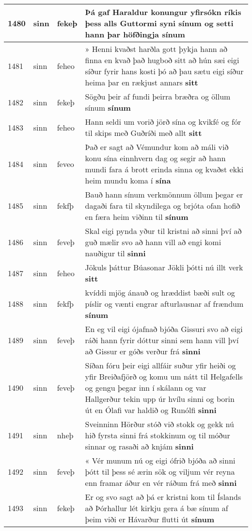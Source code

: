 \documentclass{article}
\begin{document}
\begin{longtable}{p{1cm}|p{1cm}|p{1cm}|p{13cm}}
\hline
1480&sinn&fekeþ&Þá gaf Haraldur konungur yfirsókn ríkis þess alls Guttormi syni sínum og setti hann þar höfðingja \textbf{sínum} \\
\hline
1481&sinn&feheo&» Henni kvaðst harðla gott þykja hann að finna en kvað það hugboð sitt að hún sæi eigi síður fyrir hans kosti þó að þau sætu eigi síður heima þar en rækjust annars \textbf{sitt} \\
\hline
1482&sinn&fekeþ&Sögðu þeir af fundi þeirra bræðra og öllum sínum \textbf{sínum} \\
\hline
1483&sinn&feheo&Hann seldi um vorið jörð sína og kvikfé og fór til skips með Guðríði með allt \textbf{sitt} \\
\hline
1484&sinn&feveo&Það er sagt að Vémundur kom að máli við konu sína einnhvern dag og segir að hann mundi fara á brott erinda sinna og kvaðst ekki heim mundu koma í \textbf{sína} \\
\hline
1485&sinn&fekfþ&Bauð hann sínum verkmönnum öllum þegar er dagaði fara til skyndilega og brjóta ofan hofið en færa heim viðinn til \textbf{sínum} \\
\hline
1486&sinn&feveþ&Skal eigi pynda yður til kristni að sinni því að guð mælir svo að hann vill að engi komi nauðigur til \textbf{sinni} \\
\hline
1487&sinn&feheo&Jökuls þáttur Búasonar Jökli þótti nú illt verk \textbf{sitt} \\
\hline
1488&sinn&fekfþ&kvíddi mjög ánauð og hræddist bæði sult og píslir og vænti engrar afturlausnar af frændum \textbf{sínum} \\
\hline
1489&sinn&feveþ&En eg vil eigi ójafnað bjóða Gissuri svo að eigi ráði hann fyrir dóttur sinni sem hann vill því að Gissur er góðs verður frá \textbf{sinni} \\
\hline
1490&sinn&feveþ&Síðan fóru þeir eigi allfáir suður yfir heiði og yfir Breiðafjörð og komu um nátt til Helgafells og gengu þegar inn í skálann og var Hallgerður tekin upp úr hvílu sinni og borin út en Ólafi var haldið og Runólfi \textbf{sinni} \\
\hline
1491&sinn&nheþ&Sveinninn Hörður stóð við stokk og gekk nú hið fyrsta sinni frá stokkinum og til móður sinnar og rasaði að knjám \textbf{sinni} \\
\hline
1492&sinn&feveþ&« Vér munum nú og eigi ófrið bjóða að sinni þótt til þess sé ærin sök og viljum vér reyna enn framar áður en vér ráðum frá með \textbf{sinni} \\
\hline
1493&sinn&fekeþ&Er og svo sagt að þá er kristni kom til Íslands að Þórhallur lét kirkju gera á bæ sínum af þeim viði er Hávarður flutti út \textbf{sínum} \\

\end{longtable}
\end{document}
